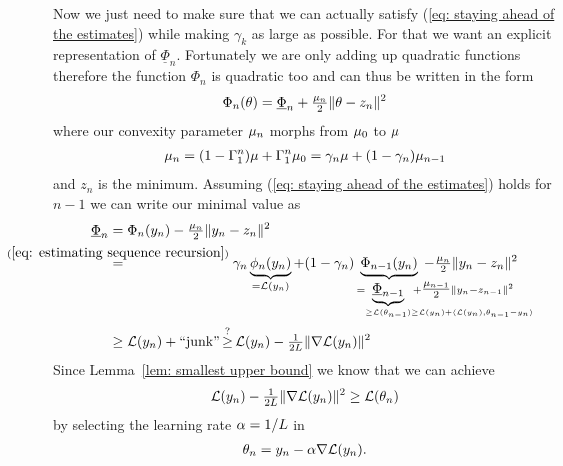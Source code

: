 Now we just need to make sure that we can actually satisfy (\ref{eq: staying
ahead of the estimates}) while making \(\gamma_k\) as large as possible.
For that we want an explicit representation of \(\underline{\Phi}_{n}\).
Fortunately we are only adding up quadratic functions therefore the function
\(\Phi_{n}\) is quadratic too and can thus be written in the form
\begin{align}\label{eq: centered Phi representation}
	\Phi_{n}(\theta) = \underline{\Phi}_{n} + \tfrac{\mu_{n}}{2}\|\theta - z_n\|^2
\end{align}
where our convexity parameter \(\mu_n\) morphs from \(\mu_0\) to
\(\mu\)
\begin{align*}
	\mu_n =(1-\Gamma_1^n)\mu + \Gamma_1^n \mu_0
	= \gamma_n \mu + (1-\gamma_n)\mu_{n-1}
\end{align*}
and \(z_n\) is the minimum. Assuming (\ref{eq: staying ahead of the estimates})
holds for \(n-1\) we can write our minimal value as
\begin{align*}
	\underline{\Phi}_n
	&= \Phi_n(y_n) - \tfrac{\lbound_n}{2}\|y_n - z_n\|^2 \\
	&\lxeq{(\ref{eq: estimating sequence recursion})}
	\gamma_n \underbrace{\phi_n(y_n)}_{
		=\Loss(y_n)
	}
	+ (1-\gamma_n)\underbrace{\Phi_{n-1}(y_n)}_{
		= \underbrace{\underline{\Phi}_{n-1}}_{
			\ge \Loss(\weights_{n-1})
			\mathrlap{\ge \Loss(y_n) + \langle \Loss(y_n), \weights_{n-1} - y_n\rangle}
		} +\mathrlap{\tfrac{\lbound_{n-1}}{2}\|y_n - z_{n-1}\|^2}
	} - \tfrac{\lbound_n}{2}\|y_n - z_n\|^2 \\
	&\ge \Loss(y_n) + \text{``junk''}
	\xge{?} \Loss(y_n) - \tfrac{1}{2\ubound}\|\nabla\Loss(y_n)\|^2
\end{align*}
Since Lemma~\ref{lem: smallest upper bound} we know that we can achieve
\begin{align*}
	\mathcal{L}(y_n) - \tfrac{1}{2L}\|\nabla\mathcal{L}(y_n)\|^2
	\ge \mathcal{L}(\theta_n)
\end{align*}
by selecting the learning rate \(\alpha=1/L\) in
\begin{align*}
	\theta_n = y_n - \alpha \nabla\mathcal{L}(y_n).
\end{align*}

